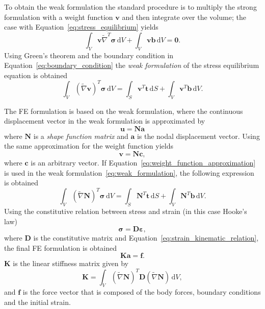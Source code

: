 To obtain the weak formulation the standard procedure is to multiply the strong formulation with a weight function $\mathbf{v}$ and then integrate over the volume; the case with Equation~\eqref{eq:stress_equilibrium} yields
\begin{equation}
	\int_V \mathbf{v} \widetilde{\nabla}^T \bm{\sigma} \,\mathrm{d}V + \int_V \mathbf{v} \mathbf{b} \,\mathrm{d}V = \bm{0}.
\end{equation}
Using Green's theorem and the boundary condition in Equation~\eqref{eq:boundary_condition} the \textit{weak formulation} of the stress equilibrium equation is obtained
\begin{equation}
	\label{eq:weak_formulation}
	\int_V \left(\widetilde{\nabla} \mathbf{v}\right)^T \bm{\sigma} \,\mathrm{d}V = \int_S \mathbf{v}^T \mathbf{t} \,\mathrm{d}S + \int_V \mathbf{v}^T \mathbf{b} \,\mathrm{d}V.
\end{equation}

The FE formulation is based on the weak formulation, where the continuous displacement vector in the weak formulation is approximated by
\begin{equation}
	\label{eq:displacement_approximation}
	\mathbf{u} = \mathbf{N}\mathbf{a}
\end{equation}
where $\mathbf{N}$ is a \textit{shape function matrix} and $\mathbf{a}$ is the nodal displacement vector. Using the same approximation for the weight function yields
\begin{equation}
	\label{eq:weight_function_approximation}
	\mathbf{v} = \mathbf{N}\mathbf{c},
\end{equation}
where $\mathbf{c}$ is an arbitrary vector. If Equation~\eqref{eq:weight_function_approximation} is used in the weak formulation~\eqref{eq:weak_formulation}, the following expression is obtained
\begin{equation}
	\int_V \left(\widetilde{\nabla} \mathbf{N}\right)^T \bm{\sigma} \,\mathrm{d}V = \int_S \mathbf{N}^T \mathbf{t} \,\mathrm{d}S + \int_V \mathbf{N}^T \mathbf{b} \,\mathrm{d}V.
\end{equation}
Using the constitutive relation between stress and strain (in this case Hooke's law)
\begin{equation}
	\label{eq:hookes_law}
	\bm{\sigma} = \mathbf{D}\bm{\varepsilon},
\end{equation}
where $\mathbf{D}$ is the constitutive matrix and Equation~\ref{eq:strain_kinematic_relation}, the final FE formulation is obtained
\begin{equation}
	\label{eq:fe_formualtion}
	\mathbf{K}\mathbf{a} = \mathbf{f}.
\end{equation}
$\mathbf{K}$ is the linear stiffness matrix given by
\begin{equation}
	\mathbf{K} = \int_V \left(\widetilde{\nabla} \mathbf{N}\right)^T \mathbf{D} \left(\widetilde{\nabla} \mathbf{N}\right) \,\mathrm{d}V,
\end{equation}
and $\mathbf{f}$ is the force vector that is composed of the body forces, boundary conditions and the initial strain.

